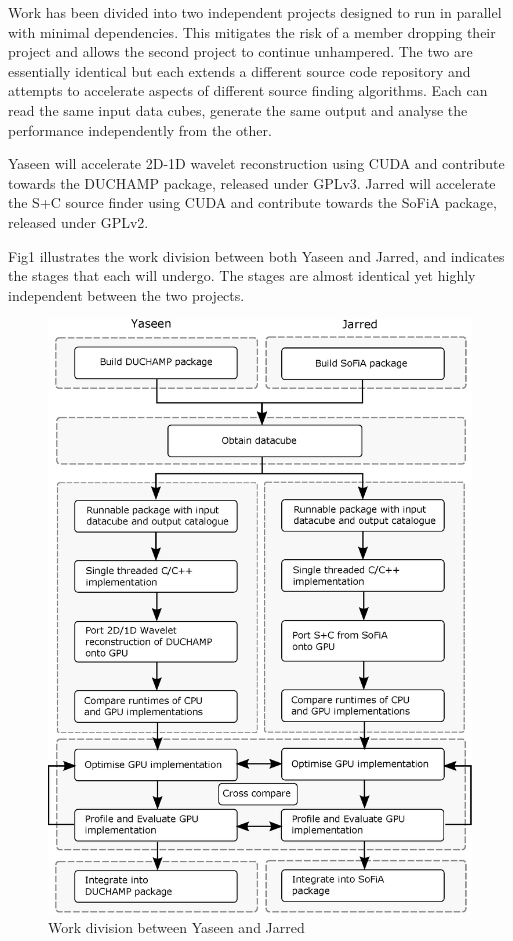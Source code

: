 \documentclass[prodmode,acmtecs]{acmsmall} \usepackage[ruled]{algorithm2e}
\begin{document}
Work has been divided into two independent projects designed to run in parallel with minimal dependencies. This mitigates the risk of a member dropping their project and allows the second project to continue unhampered. The two are essentially identical but each extends a different source code repository and attempts to accelerate aspects of different source finding algorithms. Each can read the same input data cubes, generate the same output and analyse the performance independently from the other.


Yaseen will accelerate 2D-1D wavelet reconstruction using CUDA and contribute towards the DUCHAMP package, released under GPLv3. Jarred will accelerate the S+C source finder using CUDA and contribute towards the SoFiA package, released under GPLv2.


Fig1 illustrates the work division between both Yaseen and Jarred, and indicates the stages that each will undergo. The stages are almost identical yet highly independent between the two projects.

\begin{figure}
\includegraphics[scale=.65]{dependencies}
\caption{Work division between Yaseen and Jarred}
\end{figure}



\end{document}
